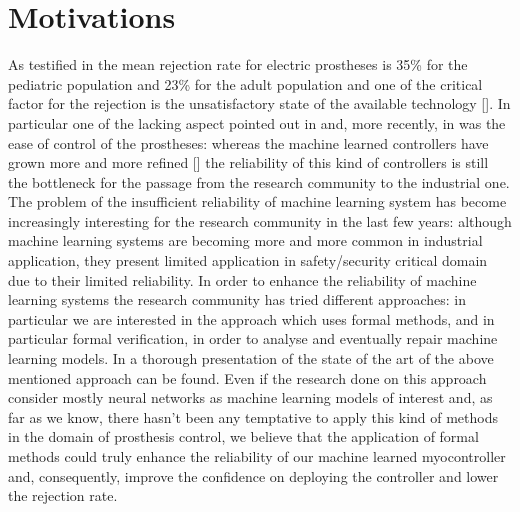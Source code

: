 \section{Motivations}\label{sec:motivations}
As testified in \cite{biddiss2007upper} the mean rejection rate for electric prostheses is 35\% for the pediatric population and 23\% for the adult population and one of the critical factor for the rejection is the unsatisfactory state of the available technology [\cite{biddiss2007upperfact}].
In particular one of the lacking aspect pointed out in \cite{biddiss2007upperfact} and, more recently, in \cite{castellini2016upper} was the ease of control of the prostheses: whereas the machine learned controllers have grown more and more refined [\cite{Strazzulla2017}] the reliability of this kind of controllers is still the bottleneck for the passage from the research community to the industrial one.
The problem of the insufficient reliability of machine learning system has become increasingly interesting for the research community in the last few years: although machine learning systems are becoming more and more common in industrial application, they present limited application in safety/security critical domain due to their limited reliability. In order to enhance the reliability of machine learning systems the research community has tried different approaches: in particular we are interested in the approach which uses formal methods, and in particular formal verification, in order to analyse and eventually repair machine learning models. In \cite{leofante2018automated} a thorough presentation of the state of the art of the above mentioned approach can be found.
Even if the research done on this approach consider mostly neural networks as machine learning models of interest and, as far as we know, there hasn't been any temptative to apply this kind of methods in the domain of prosthesis control, we believe that the application of formal methods could truly enhance the reliability of our machine learned myocontroller and, consequently, improve the confidence on deploying the controller and lower the rejection rate.